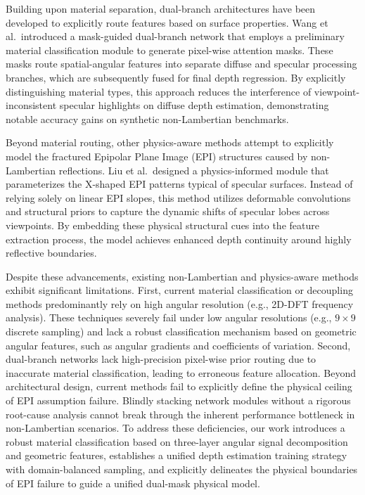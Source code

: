 \documentclass[lettersize,journal]{IEEEtran}
\begin{document}
Building upon material separation, dual-branch architectures have been developed to explicitly route features based on surface properties. Wang et al.\ introduced a mask-guided dual-branch network that employs a preliminary material classification module to generate pixel-wise attention masks. These masks route spatial-angular features into separate diffuse and specular processing branches, which are subsequently fused for final depth regression. By explicitly distinguishing material types, this approach reduces the interference of viewpoint-inconsistent specular highlights on diffuse depth estimation, demonstrating notable accuracy gains on synthetic non-Lambertian benchmarks.

Beyond material routing, other physics-aware methods attempt to explicitly model the fractured Epipolar Plane Image (EPI) structures caused by non-Lambertian reflections. Liu et al.\ designed a physics-informed module that parameterizes the X-shaped EPI patterns typical of specular surfaces. Instead of relying solely on linear EPI slopes, this method utilizes deformable convolutions and structural priors to capture the dynamic shifts of specular lobes across viewpoints. By embedding these physical structural cues into the feature extraction process, the model achieves enhanced depth continuity around highly reflective boundaries.

Despite these advancements, existing non-Lambertian and physics-aware methods exhibit significant limitations. First, current material classification or decoupling methods predominantly rely on high angular resolution (e.g., 2D-DFT frequency analysis). These techniques severely fail under low angular resolutions (e.g., $9 \times 9$ discrete sampling) and lack a robust classification mechanism based on geometric angular features, such as angular gradients and coefficients of variation. Second, dual-branch networks lack high-precision pixel-wise prior routing due to inaccurate material classification, leading to erroneous feature allocation. Beyond architectural design, current methods fail to explicitly define the physical ceiling of EPI assumption failure. Blindly stacking network modules without a rigorous root-cause analysis cannot break through the inherent performance bottleneck in non-Lambertian scenarios. To address these deficiencies, our work introduces a robust material classification based on three-layer angular signal decomposition and geometric features, establishes a unified depth estimation training strategy with domain-balanced sampling, and explicitly delineates the physical boundaries of EPI failure to guide a unified dual-mask physical model.
\end{document}
